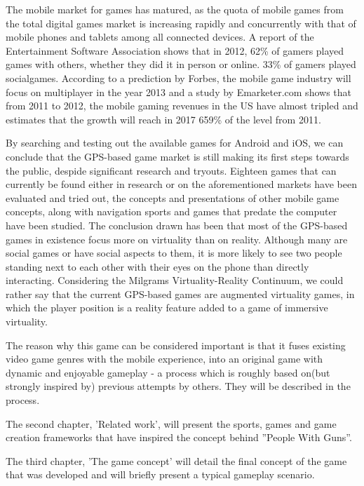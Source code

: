 The mobile market for games has matured, as the quota of mobile games from the
total digital games market is increasing rapidly and concurrently with that of
mobile phones and tablets among all connected devices. A report of the
Entertainment Software Association shows that in 2012, 62\% of gamers played
games with others, whether they did it in person or online. 33\% of gamers
played socialgames\cite{esa}. According to a prediction by Forbes, the mobile
game industry will focus on multiplayer in the year 2013\cite{forbes}
and a study by Emarketer.com shows that from 2011 to 2012, the mobile
gaming revenues in the US have almost tripled and estimates that the
growth will reach in 2017 659\% of the level from 2011\cite{emarketer}.\newline

By searching and testing out the available games for Android and iOS, we can
conclude that the GPS-based game market is still making its first steps towards
the public, despide significant research and tryouts. Eighteen games that can
currently be found either in research or on the aforementioned markets have been
evaluated and tried out, the concepts and presentations of other mobile game
concepts, along with navigation sports and games that predate the computer have
been studied. The conclusion drawn has been that most of the GPS-based games in
existence focus more on virtuality than on reality. Although many are social
games or have social aspects to them, it is more likely to see two people
standing next to each other with their eyes on the phone than directly
interacting. Considering the Milgrams Virtuality-Reality Continuum, we could
rather say that the current GPS-based games are augmented virtuality games, in
which the player position is a reality feature added to a game of immersive
virtuality.\newline

The reason why this game can be considered important is that it fuses existing
video game genres with the mobile experience, into an original game with dynamic
and enjoyable gameplay - a process which is roughly based on(but strongly
inspired by) previous attempts by others. They will be described in the
process.\newline

The second chapter, 'Related work', will present the sports, games and game
creation frameworks that have inspired the concept behind ''People With Guns''.
\newline

The third chapter, 'The game concept' will detail the final concept of the game
that was developed and will briefly present a typical gameplay scenario.\newline

